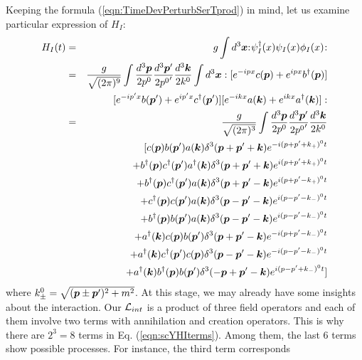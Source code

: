 Keeping the formula (\ref{eqn:TimeDevPerturbSerTprod}) in mind,
let us examine particular expression of $H_I$:
\begin{eqnarray}
H_I(t) 
&=&
g \int d^3 \mbox{\boldmath $x$} 
{:\mathrel{\mspace{1mu} \psi_I^\dagger(x) \psi_I(x) \phi_I(x)\mspace{1mu}}:}
\nonumber\\
&=&
\frac{g}{\sqrt{(2\pi)^9}} 
\int
\frac{d^3 \mbox{\boldmath $p$}}{2p^0}
\frac{d^3 \mbox{\boldmath $p$}'}{2{p^0}'}
\frac{d^3 \mbox{\boldmath $k$}}{2k^0}
\int 
d^3 \mbox{\boldmath $x$} 
:
[ e^{-ipx} c(\mbox{\boldmath $p$}) + e^{ipx} b^\dagger(\mbox{\boldmath $p$}) ]
\nonumber\\
&&
\hspace{7mm}
[ e^{-ip'x} b(\mbox{\boldmath $p$}') + e^{ip'x} c^\dagger(\mbox{\boldmath $p$}') ]
[ e^{-ikx} a(\mbox{\boldmath $k$}) + e^{ikx} a^\dagger(\mbox{\boldmath $k$}) ]
:
\nonumber\\
&=&
\frac{g}{\sqrt{(2\pi)^3}} 
\int
\frac{d^3 \mbox{\boldmath $p$}}{2p^0}
\frac{d^3 \mbox{\boldmath $p$}'}{2{p^0}'}
\frac{d^3 \mbox{\boldmath $k$}}{2k^0}
\nonumber\\
&&
[c(\mbox{\boldmath $p$})b(\mbox{\boldmath $p$}')a(\mbox{\boldmath $k$})\delta^3(\mbox{\boldmath $p$}+\mbox{\boldmath $p$}'+\mbox{\boldmath $k$})
e^{-i (p + p' + k_+)^0 t}
\nonumber\\
&&
+b^\dagger(\mbox{\boldmath $p$}) c^\dagger(\mbox{\boldmath $p$}') a^\dagger(\mbox{\boldmath $k$}) \delta^3(\mbox{\boldmath $p$}+\mbox{\boldmath $p$}'+\mbox{\boldmath $k$})
e^{i (p + p' + k_+)^0 t}
\nonumber\\
&&
+b^\dagger(\mbox{\boldmath $p$}) c^\dagger (\mbox{\boldmath $p$}')a(\mbox{\boldmath $k$})\delta^3(\mbox{\boldmath $p$}+\mbox{\boldmath $p$}'-\mbox{\boldmath $k$})
e^{i (p + p' - k_+)^0 t}
\nonumber\\
&&
+c^\dagger(\mbox{\boldmath $p$})c(\mbox{\boldmath $p$}')a(\mbox{\boldmath $k$})\delta^3(\mbox{\boldmath $p$}-\mbox{\boldmath $p$}'-\mbox{\boldmath $k$})
e^{i (p - p' - k_-)^0 t}
\nonumber\\
&&
+b^\dagger(\mbox{\boldmath $p$})b(\mbox{\boldmath $p$}')a(\mbox{\boldmath $k$})\delta^3(\mbox{\boldmath $p$}-\mbox{\boldmath $p$}'-\mbox{\boldmath $k$})
e^{i (p - p' - k_-)^0 t}
\nonumber\\
&&
+a^\dagger(\mbox{\boldmath $k$})c(\mbox{\boldmath $p$})b(\mbox{\boldmath $p$}')\delta^3(\mbox{\boldmath $p$}+\mbox{\boldmath $p$}'-\mbox{\boldmath $k$})
e^{-i (p + p' - k_-)^0 t}
\nonumber\\
&&
+a^\dagger(\mbox{\boldmath $k$})c^\dagger(\mbox{\boldmath $p$}')c(\mbox{\boldmath $p$})\delta^3(\mbox{\boldmath $p$}-\mbox{\boldmath $p$}'-\mbox{\boldmath $k$})
e^{-i (p - p' - k_-)^0 t}
\nonumber\\
&&
+a^\dagger(\mbox{\boldmath $k$})b^\dagger(\mbox{\boldmath $p$})b(\mbox{\boldmath $p$}')\delta^3(-\mbox{\boldmath $p$}+\mbox{\boldmath $p$}'-\mbox{\boldmath $k$})
e^{i (p - p' + k_-)^0 t}]
\label{eqn:scYHIterms}
\end{eqnarray}
where $k_\pm^0 = \sqrt{(\mbox{\boldmath $p$} \pm \mbox{\boldmath $p$}')^2 + m^2}$.
At this stage, we may already have some insights about the interaction.
Our ${\cal L}_{int}$ is a product of three field operators and each of them
involve two terms with annihilation and creation operators. This is why there
are $2^3 = 8$ terms in Eq. (\ref{eqn:scYHIterms}). Among them, the last
6 terms show possible processes. For instance, the third term corresponds
